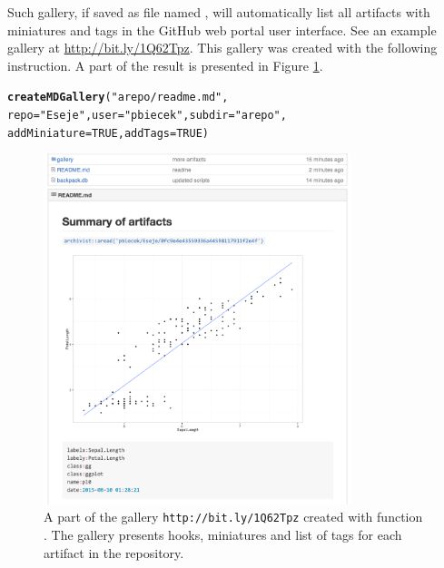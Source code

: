 \documentclass[nojss]{jss}\usepackage[]{graphicx}\usepackage[]{color}
\makeatletter
\newcommand{\hlnum}[1]{\textcolor[rgb]{0.686,0.059,0.569}{#1}}%
\newcommand{\hlstr}[1]{\textcolor[rgb]{0.192,0.494,0.8}{#1}}%
\newcommand{\hlstd}[1]{\textcolor[rgb]{0.345,0.345,0.345}{#1}}%
\newcommand{\hlkwc}[1]{\textcolor[rgb]{0.333,0.667,0.333}{#1}}%
\newcommand{\hlkwd}[1]{\textcolor[rgb]{0.737,0.353,0.396}{\textbf{#1}}}%
\newenvironment{kframe}{%
 \def\at@end@of@kframe{}%
 \ifinner\ifhmode%
  \def\at@end@of@kframe{\end{minipage}}%
  \begin{minipage}{\columnwidth}%
 \fi\fi%
 \def\FrameCommand##1{\hskip\@totalleftmargin \hskip-\fboxsep
 \colorbox{shadecolor}{##1}\hskip-\fboxsep
     \hskip-\linewidth \hskip-\@totalleftmargin \hskip\columnwidth}%
 \MakeFramed {\advance\hsize-\width
   \@totalleftmargin\z@ \linewidth\hsize
   \@setminipage}}%
 {\par\unskip\endMakeFramed%
 \at@end@of@kframe}
\newenvironment{knitrout}{}{} %
\makeatother
\begin{document}
Such gallery, if saved as file named , will automatically list all artifacts with miniatures and tags in the GitHub web portal user interface. See an example gallery at \url{http://bit.ly/1Q62Tpz}.
This gallery was created with the following instruction. A part of the result is presented in Figure \ref{figExample4}.

\begin{knitrout}
\color{fgcolor}\begin{kframe}
\begin{alltt}
\hlkwd{createMDGallery}\hlstd{(}\hlstr{"arepo/readme.md"}\hlstd{,}
           \hlkwc{repo} \hlstd{=} \hlstr{"Eseje"}\hlstd{,} \hlkwc{user} \hlstd{=} \hlstr{"pbiecek"}\hlstd{,} \hlkwc{subdir} \hlstd{=} \hlstr{"arepo"}\hlstd{,}
           \hlkwc{addMiniature} \hlstd{=} \hlnum{TRUE}\hlstd{,} \hlkwc{addTags} \hlstd{=} \hlnum{TRUE}\hlstd{)}
\end{alltt}
\end{kframe}
\end{knitrout}



\begin{figure}[h!]
\centering
\includegraphics[width=0.8\textwidth]{Figures/addReadme.png}
\caption{\label{figExample4}A part of the gallery \texttt{http://bit.ly/1Q62Tpz} created with function . The gallery presents hooks, miniatures and list of tags for each artifact in the repository.}
\end{figure}
\end{document}
